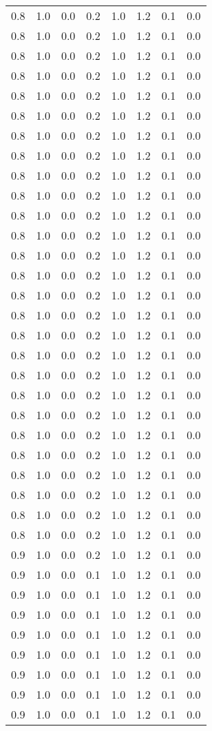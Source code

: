 \begin{tabular}{L{1in}|L{1in}|L{1in}|L{1in}|L{1in}|L{1in}|L{1in}|L{1in}}
0.8&1.0&0.0&0.2&1.0&1.2&0.1&0.0\\
0.8&1.0&0.0&0.2&1.0&1.2&0.1&0.0\\
0.8&1.0&0.0&0.2&1.0&1.2&0.1&0.0\\
0.8&1.0&0.0&0.2&1.0&1.2&0.1&0.0\\
0.8&1.0&0.0&0.2&1.0&1.2&0.1&0.0\\
0.8&1.0&0.0&0.2&1.0&1.2&0.1&0.0\\
0.8&1.0&0.0&0.2&1.0&1.2&0.1&0.0\\
0.8&1.0&0.0&0.2&1.0&1.2&0.1&0.0\\
0.8&1.0&0.0&0.2&1.0&1.2&0.1&0.0\\
0.8&1.0&0.0&0.2&1.0&1.2&0.1&0.0\\
0.8&1.0&0.0&0.2&1.0&1.2&0.1&0.0\\
0.8&1.0&0.0&0.2&1.0&1.2&0.1&0.0\\
0.8&1.0&0.0&0.2&1.0&1.2&0.1&0.0\\
0.8&1.0&0.0&0.2&1.0&1.2&0.1&0.0\\
0.8&1.0&0.0&0.2&1.0&1.2&0.1&0.0\\
0.8&1.0&0.0&0.2&1.0&1.2&0.1&0.0\\
0.8&1.0&0.0&0.2&1.0&1.2&0.1&0.0\\
0.8&1.0&0.0&0.2&1.0&1.2&0.1&0.0\\
0.8&1.0&0.0&0.2&1.0&1.2&0.1&0.0\\
0.8&1.0&0.0&0.2&1.0&1.2&0.1&0.0\\
0.8&1.0&0.0&0.2&1.0&1.2&0.1&0.0\\
0.8&1.0&0.0&0.2&1.0&1.2&0.1&0.0\\
0.8&1.0&0.0&0.2&1.0&1.2&0.1&0.0\\
0.8&1.0&0.0&0.2&1.0&1.2&0.1&0.0\\
0.8&1.0&0.0&0.2&1.0&1.2&0.1&0.0\\
0.8&1.0&0.0&0.2&1.0&1.2&0.1&0.0\\
0.8&1.0&0.0&0.2&1.0&1.2&0.1&0.0\\
0.9&1.0&0.0&0.2&1.0&1.2&0.1&0.0\\
0.9&1.0&0.0&0.1&1.0&1.2&0.1&0.0\\
0.9&1.0&0.0&0.1&1.0&1.2&0.1&0.0\\
0.9&1.0&0.0&0.1&1.0&1.2&0.1&0.0\\
0.9&1.0&0.0&0.1&1.0&1.2&0.1&0.0\\
0.9&1.0&0.0&0.1&1.0&1.2&0.1&0.0\\
0.9&1.0&0.0&0.1&1.0&1.2&0.1&0.0\\
0.9&1.0&0.0&0.1&1.0&1.2&0.1&0.0\\
0.9&1.0&0.0&0.1&1.0&1.2&0.1&0.0\\

\end{tabular}
